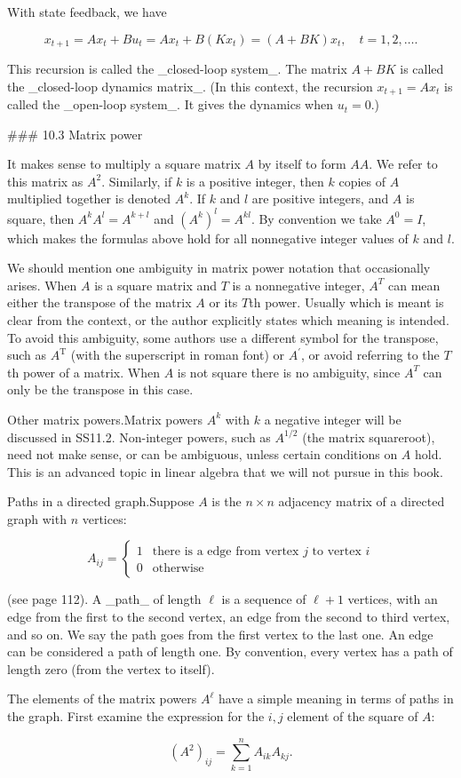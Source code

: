 With state feedback, we have

\[x_{t+1}=Ax_{t}+Bu_{t}=Ax_{t}+B(Kx_{t})=(A+BK)x_{t},\quad t=1,2,\ldots.\]

This recursion is called the _closed-loop system_. The matrix \(A+BK\) is called the _closed-loop dynamics matrix_. (In this context, the recursion \(x_{t+1}=Ax_{t}\) is called the _open-loop system_. It gives the dynamics when \(u_{t}=0\).)

### 10.3 Matrix power

It makes sense to multiply a square matrix \(A\) by itself to form \(AA\). We refer to this matrix as \(A^{2}\). Similarly, if \(k\) is a positive integer, then \(k\) copies of \(A\) multiplied together is denoted \(A^{k}\). If \(k\) and \(l\) are positive integers, and \(A\) is square, then \(A^{k}A^{l}=A^{k+l}\) and \((A^{k})^{l}=A^{kl}\). By convention we take \(A^{0}=I\), which makes the formulas above hold for all nonnegative integer values of \(k\) and \(l\).

We should mention one ambiguity in matrix power notation that occasionally arises. When \(A\) is a square matrix and \(T\) is a nonnegative integer, \(A^{T}\) can mean either the transpose of the matrix \(A\) or its \(T\)th power. Usually which is meant is clear from the context, or the author explicitly states which meaning is intended. To avoid this ambiguity, some authors use a different symbol for the transpose, such as \(A^{\mathrm{T}}\) (with the superscript in roman font) or \(A^{\prime}\), or avoid referring to the \(T\)th power of a matrix. When \(A\) is not square there is no ambiguity, since \(A^{T}\) can only be the transpose in this case.

Other matrix powers.Matrix powers \(A^{k}\) with \(k\) a negative integer will be discussed in SS11.2. Non-integer powers, such as \(A^{1/2}\) (the matrix squareroot), need not make sense, or can be ambiguous, unless certain conditions on \(A\) hold. This is an advanced topic in linear algebra that we will not pursue in this book.

Paths in a directed graph.Suppose \(A\) is the \(n\times n\) adjacency matrix of a directed graph with \(n\) vertices:

\[A_{ij}=\left\{\begin{array}{ll}1&\mbox{there is a edge from vertex $j$ to vertex $i$}\\ 0&\mbox{otherwise}\end{array}\right.\]

(see page 112). A _path_ of length \(\ell\) is a sequence of \(\ell+1\) vertices, with an edge from the first to the second vertex, an edge from the second to third vertex, and so on. We say the path goes from the first vertex to the last one. An edge can be considered a path of length one. By convention, every vertex has a path of length zero (from the vertex to itself).

The elements of the matrix powers \(A^{\ell}\) have a simple meaning in terms of paths in the graph. First examine the expression for the \(i,j\) element of the square of \(A\):

\[(A^{2})_{ij}=\sum_{k=1}^{n}A_{ik}A_{kj}.\] 